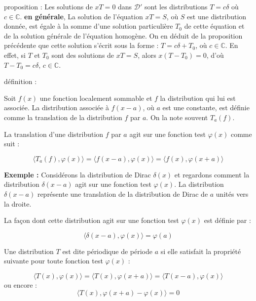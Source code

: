 \documentclass{beamer}
\begin{document}
\begin{frame}
\begin{block}{proposition :}
Les solutions de \( xT = 0 \) dans \( \mathcal{D}' \) sont les distributions \( T = c\delta \) où \( c \in \mathbb{C} \).
\textbf{en générale}, La solution de l'équation \( xT = S \), où \( S \) est une distribution donnée, est égale à la somme d'une solution particulière \( T_0 \) de cette équation et de la solution générale de l'équation homogène. On en déduit de la proposition précédente que cette solution s'écrit sous la forme : \( T = c \delta + T_0 \), où \( c \in \mathbb{C} \). En effet, si \( T \) et \( T_0 \) sont des solutions de \( xT = S \), alors \( x(T-T_0) = 0 \), d'où \( T-T_0 = c\delta \), \( c \in \mathbb{C} \).

\end{block}

\end{frame}
\begin{frame}
\begin{block}{définition :}

Soit \( f(x) \) une fonction localement sommable et \( f \) la distribution qui lui est associée. La distribution associée à \( f(x - a) \), où \( a \) est une constante, est définie comme la translation de la distribution \( f \) par \( a \). On la note souvent \( T_a(f) \).

La translation d'une distribution \( f \) par \( a \) agit sur une fonction test \( \varphi(x) \) comme suit :

\[ \langle T_a(f), \varphi(x) \rangle = \langle f(x - a), \varphi(x) \rangle = \langle f(x), \varphi(x + a) \rangle \]

\end{block}

\textbf{Exemple :}
    Considérons la distribution de Dirac \( \delta(x) \) et regardons comment la distribution \( \delta(x - a) \) agit sur une fonction test \( \varphi(x) \). La distribution \( \delta(x - a) \) représente une translation de la distribution de Dirac de \( a \) unités vers la droite.

La façon dont cette distribution agit sur une fonction test \( \varphi(x) \) est définie par :

\[ \langle \delta(x - a), \varphi(x) \rangle = \varphi(a) \]

\end{frame}
\begin{frame}

\begin{definition}
Une distribution \( T \) est dite périodique de période \( a \) si elle satisfait la propriété suivante pour toute fonction test \( \varphi(x) \) :

\[ \langle T(x), \varphi(x) \rangle = \langle T(x), \varphi(x + a) \rangle  = \langle T(x - a), \varphi(x) \rangle\]
ou encore :
\[ \langle T(x), \varphi(x + a) - \varphi(x) \rangle = 0 \]

\end{definition}

\end{frame}
\end{document}
